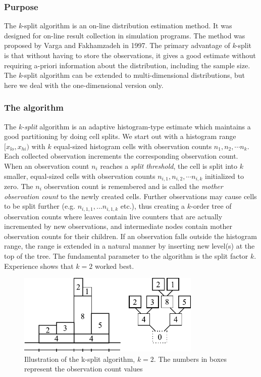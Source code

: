 \subsubsection{Purpose}


The \textit{k}-split algorithm is an on-line distribution
estimation method.  It was
designed for on-line result collection in simulation programs.  The
method was proposed by Varga and Fakhamzadeh in 1997. The primary
advantage of \textit{k}-split is that without having to store the
observations, it gives a good estimate without requiring a-priori
information about the distribution, including the sample size. The
\textit{k}-split algorithm can be extended to multi-dimensional
distributions, but here we deal
with the one-dimensional version only.


\subsubsection{The algorithm}


The \textit{k-split} algorithm is an adaptive histogram-type estimate which
maintains a good partitioning by doing cell splits. We start out with
a histogram range $[x_{lo}, x_{hi})$ with $k$ equal-sized histogram
cells with observation counts $n_1,n_2, \cdots n_k$.  Each collected
observation increments the corresponding observation count. When an
observation count $n_i$ reaches a \textit{split threshold}, the cell
is split into $k$ smaller, equal-sized cells with observation counts
$n_{i,1}, n_{i,2}, \cdots n_{i,k}$ initialized to zero. The $n_i$
observation count is remembered and is called the \textit{mother
  observation count} to the newly created cells. Further observations
may cause cells to be split further (e.g. $n_{i,1,1},...n_{i,1,k}$
etc.), thus creating a $k$-order tree of observation counts where
leaves contain live counters that are actually incremented by new
observations, and intermediate nodes contain mother observation counts
for their children. If an observation falls outside the histogram
range, the range is extended in a natural manner by inserting new
level(s) at the top of the tree. The fundamental parameter to the
algorithm is the split factor $k$. Experience shows that $k=2$ worked best.

\begin{figure}[htbp]
  \begin{center}
    \includegraphics[width=3.442in, height=1.518in]{figures/usmanFig15}
    \caption{Illustration of the k-split algorithm, $k=2$. The
      numbers in boxes represent the observation count values}
  \end{center}
\end{figure}


